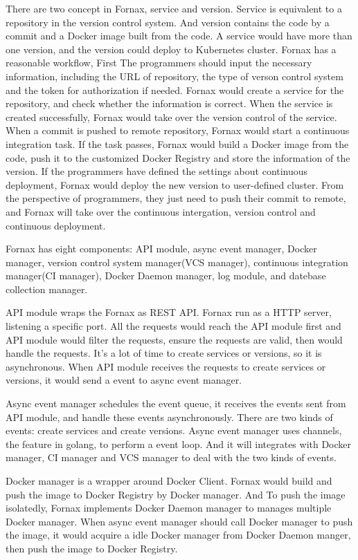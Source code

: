\begin{bigabstract}
There are two concept in Fornax, service and version. Service is equivalent to a repository in the version control system. And version contains the code by a commit and a Docker image built from the code. A service would have more than one version, and the version could deploy to Kubernetes cluster. Fornax has a reasonable workflow, First The programmers should input the necessary information, including the URL of repository, the type of verson control system and the token for authorization if needed. Fornax would create a service for the repository, and check whether the information is correct. When the service is created successfully, Fornax would take over the version control of the service. When a commit is pushed to remote repository, Fornax would start a continuous integration task. If the task passes, Fornax would build a Docker image from the code, push it to the customized Docker Registry and store the information of the version. If the programmers have defined the settings about continuous deployment, Fornax would deploy the new version to user-defined cluster. From the perspective of programmers, they just need to push their commit to remote, and Fornax will take over the continuous intergation, version control and continuous deployment.

Fornax has eight components: API module, async event manager, Docker manager, version control system manager(VCS manager), continuous integration manager(CI manager), Docker Daemon manager, log module, and datebase collection manager. 

API module wraps the Fornax as REST API. Fornax run as a HTTP server, listening a specific port. All the requests would reach the API module first and API module would filter the requests, ensure the requests are valid, then would handle the requests. It's a lot of time to create services or versions, so it is asynchronous. When API module receives the requests to create services or versions, it would send a event to async event manager.

Async event manager schedules the event queue, it receives the events sent from API module, and handle these events asynchronously. There are two kinds of events: create services and create versions. Async event manager uses channels, the feature in golang, to perform a event loop. And it will integrates with Docker manager, CI manager and VCS manager to deal with the two kinds of events.

Docker manager is a wrapper around Docker Client. Fornax would build and push the image to Docker Registry by Docker manager. And To push the image isolatedly, Fornax implements Docker Daemon manager to manages multiple Docker manager. When async event manager should call Docker manager to push the image, it would acquire a idle Docker manager from Docker Daemon manger, then push the image to Docker Registry.


\end{bigabstract}
